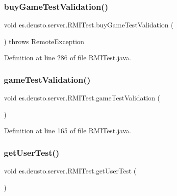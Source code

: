 \subsubsection{\texorpdfstring{buy\+Game\+Test\+Validation()}{buyGameTestValidation()}}
{\footnotesize\ttfamily void es.\+deusto.\+server.\+R\+M\+I\+Test.\+buy\+Game\+Test\+Validation (\begin{DoxyParamCaption}{ }\end{DoxyParamCaption}) throws Remote\+Exception}



Definition at line 286 of file R\+M\+I\+Test.\+java.

\mbox{\label{classes_1_1deusto_1_1server_1_1_r_m_i_test_a75cd40a6006bfc550385da05b91834d1}} 
\subsubsection{\texorpdfstring{game\+Test\+Validation()}{gameTestValidation()}}
{\footnotesize\ttfamily void es.\+deusto.\+server.\+R\+M\+I\+Test.\+game\+Test\+Validation (\begin{DoxyParamCaption}{ }\end{DoxyParamCaption})}



Definition at line 165 of file R\+M\+I\+Test.\+java.

\mbox{\label{classes_1_1deusto_1_1server_1_1_r_m_i_test_a6cf336e0c15c62f0d1f5a9dc912729b4}} 
\subsubsection{\texorpdfstring{get\+User\+Test()}{getUserTest()}}
{\footnotesize\ttfamily void es.\+deusto.\+server.\+R\+M\+I\+Test.\+get\+User\+Test (\begin{DoxyParamCaption}{ }\end{DoxyParamCaption})}



